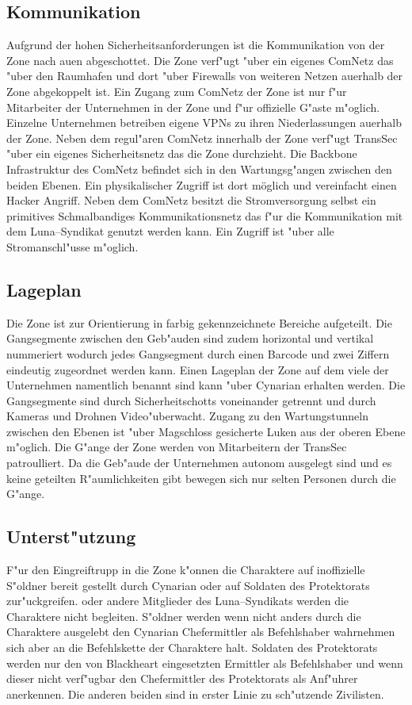 \subsection{Kommunikation} 
Aufgrund der hohen Sicherheitsanforderungen ist die Kommunikation von der Zone nach au\3en abgeschottet. Die Zone verf"ugt "uber ein eigenes ComNetz das "uber den Raumhafen und dort "uber Firewalls von weiteren Netzen au\3erhalb der Zone abgekoppelt ist. Ein Zugang zum ComNetz der Zone ist nur f"ur Mitarbeiter der Unternehmen in der Zone und f"ur offizielle G"aste m"oglich. Einzelne Unternehmen betreiben eigene VPNs zu ihren Niederlassungen au\3erhalb der Zone. Neben dem regul"aren ComNetz innerhalb der Zone verf"ugt TransSec "uber ein eigenes Sicherheitsnetz das die Zone durchzieht. Die Backbone Infrastruktur des ComNetz befindet sich in den Wartungsg"angen zwischen den beiden Ebenen. Ein physikalischer Zugriff ist dort möglich und vereinfacht einen Hacker Angriff. Neben dem ComNetz besitzt die Stromversorgung selbst ein primitives Schmalbandiges Kommunikationsnetz das f"ur die Kommunikation mit dem Luna--Syndikat genutzt werden kann. Ein Zugriff ist "uber alle Stromanschl"usse m"oglich.

\subsection{Lageplan} 
Die Zone ist zur Orientierung in farbig gekennzeichnete Bereiche aufgeteilt. Die Gangsegmente zwischen den Geb"auden sind zudem horizontal und vertikal nummeriert wodurch jedes Gangsegment durch einen Barcode und zwei Ziffern eindeutig zugeordnet werden kann. Einen Lageplan der Zone auf dem viele der Unternehmen namentlich benannt sind kann "uber Cynarian erhalten werden. Die Gangsegmente sind durch Sicherheitschotts voneinander getrennt und durch Kameras und Drohnen Video"uberwacht. Zugang zu den Wartungstunneln zwischen den Ebenen ist "uber Magschloss gesicherte Luken aus der oberen Ebene m"oglich. Die G"ange der Zone werden von Mitarbeitern der TransSec patroulliert. Da die Geb"aude der Unternehmen autonom ausgelegt sind und es keine geteilten R"aumlichkeiten gibt bewegen sich nur selten Personen durch die G"ange.

\subsection{Unterst"utzung} 
F"ur den Eingreiftrupp in die Zone k"onnen die Charaktere auf inoffizielle S"oldner bereit gestellt durch Cynarian oder auf Soldaten des Protektorats zur"uckgreifen. \xl{} oder andere Mitglieder des Luna--Syndikats werden die Charaktere nicht begleiten. S"oldner werden wenn nicht anders durch die Charaktere ausgelebt den Cynarian Chefermittler als Befehlshaber wahrnehmen sich aber an die Befehlskette der Charaktere halt. Soldaten des Protektorats werden nur den von Blackheart eingesetzten Ermittler als Befehlshaber und wenn dieser nicht verf"ugbar den Chefermittler des Protektorats als Anf"uhrer anerkennen. Die anderen beiden sind in erster Linie zu sch"utzende Zivilisten.

